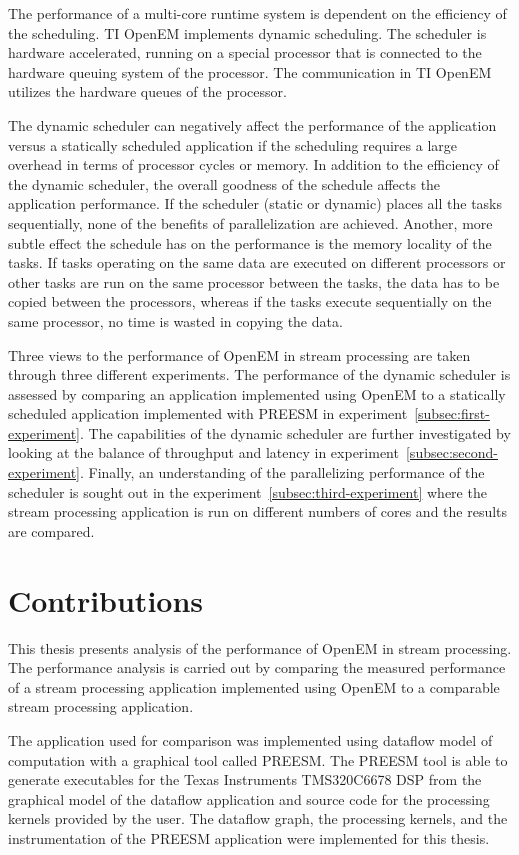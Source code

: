The performance of a multi-core runtime system is dependent on the efficiency of the scheduling. TI OpenEM implements dynamic scheduling. The scheduler is hardware accelerated, running on a special processor that is connected to the hardware queuing system of the processor. The communication in TI OpenEM utilizes the hardware queues of the processor.

The dynamic scheduler can negatively affect the performance of the application versus a statically scheduled application if the scheduling requires a large overhead in terms of processor cycles or memory. In addition to the efficiency of the dynamic scheduler, the overall goodness of the schedule affects the application performance. If the scheduler (static or dynamic) places all the tasks sequentially, none of the benefits of parallelization are achieved. Another, more subtle effect the schedule has on the performance is the memory locality of the tasks. If tasks operating on the same data are executed on different processors or other tasks are run on the same processor between the tasks, the data has to be copied between the processors, whereas if the tasks execute sequentially on the same processor, no time is wasted in copying the data.

Three views to the performance of OpenEM in stream processing are taken through three different experiments. The performance of the dynamic scheduler is assessed by comparing an application implemented using OpenEM to a statically scheduled application implemented with PREESM in experiment~\ref{subsec:first-experiment}. The capabilities of the dynamic scheduler are further investigated by looking at the balance of throughput and latency in experiment~\ref{subsec:second-experiment}. Finally, an understanding of the parallelizing performance of the scheduler is sought out in the experiment~\ref{subsec:third-experiment} where the stream processing application is run on different numbers of cores and the results are compared.

\section{Contributions}
\label{section:contributions}
This thesis presents analysis of the performance of OpenEM in stream processing. The performance analysis is carried out by comparing the measured performance of a stream processing application implemented using OpenEM to a comparable stream processing application.

The application used for comparison was implemented using dataflow model of computation with a graphical tool called PREESM. The PREESM tool is able to generate executables for the Texas Instruments TMS320C6678 DSP from the graphical model of the dataflow application and source code for the processing kernels provided by the user. The dataflow graph, the processing kernels, and the instrumentation of the PREESM application were implemented for this thesis.

